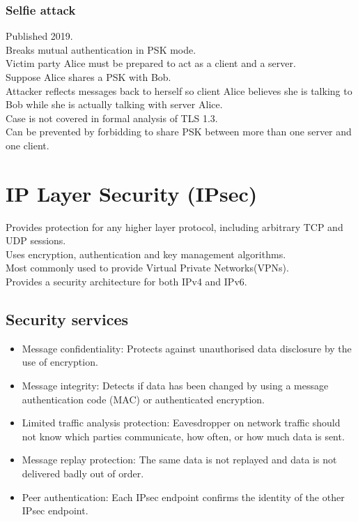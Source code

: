 \documentclass{article}
\begin{document}
\subsubsection{Selfie attack}

Published 2019.\\
Breaks mutual authentication in PSK mode.\\
Victim party Alice must be prepared to act as a client and a server.\\
Suppose Alice shares a PSK with Bob.\\
Attacker reflects messages back to herself so client Alice believes she is talking to Bob while she is actually talking with server Alice.\\
Case is not covered in formal analysis of TLS 1.3.\\
Can be prevented by forbidding to share PSK between more than one server and one client.

\newpage
\section{IP Layer Security (IPsec)}

Provides protection for any higher layer protocol, including arbitrary TCP and UDP sessions.\\
Uses encryption, authentication and key management algorithms.\\
Most commonly used to provide Virtual Private Networks(VPNs).\\
Provides a security architecture for both IPv4 and IPv6.

\subsection{Security services}

\begin{itemize}
    \item Message confidentiality: Protects against unauthorised data disclosure by the use of encryption.
    \item Message integrity: Detects if data has been changed by using a message authentication code (MAC) or authenticated encryption.
    \item Limited traffic analysis protection: Eavesdropper on network traffic should not know which parties communicate, how often, or how much data is sent.
    \item Message replay protection: The same data is not replayed and data is not delivered badly out of order.
    \item Peer authentication: Each IPsec endpoint confirms the identity of the other IPsec endpoint.
\end{itemize}
\end{document}
